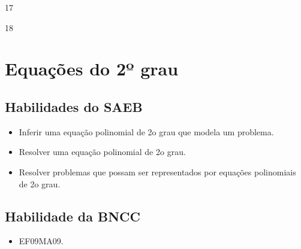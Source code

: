 \begin{escolha}
\begin{boxmedio}
\begin{boxmedio}
{\begin{boxpeq}
\begin{boxpeq}
{\begin{boxpeq}
\begin{boxmedio}
\begin{boxmedio}
\begin{boxpeq}
\begin{boxmedio}
\begin{boxpeq}
\begin{boxpeq}
\begin{boxpeq}
\begin{boxpeq}
\begin{boxmedio}
{\begin{boxmedio}
\begin{boxmedio}
\begin{boxpeq}
\begin{boxmedio}
\begin{boxpeq}
\begin{boxpeq}
\begin{boxpeq}
\begin{escolha}
{\begin{boxmedio}
\begin{boxpeq}
\begin{boxpeq}
\begin{boxpeq}
\begin{boxpeq}
\begin{escolha}
  \item 17

  \item 18
\end{escolha}


\chapter{Equações do 2º grau}

\section{Habilidades do SAEB}

\begin{itemize}

  \item Inferir uma equação polinomial de 2o grau que modela um problema.
  \item Resolver uma equação polinomial de 2o grau.
  \item Resolver problemas que possam ser representados por equações
polinomiais de 2o grau.   

\end{itemize} 

\section{Habilidade da BNCC}

\begin{itemize}
  \item EF09MA09.
\end{itemize}

\conteudo{

}
\end{boxpeq}
\end{boxpeq}
\end{boxpeq}
\end{boxpeq}
\end{boxmedio}}
\end{escolha}
\end{boxpeq}
\end{boxpeq}
\end{boxpeq}
\end{boxmedio}
\end{boxpeq}
\end{boxmedio}
\end{boxmedio}}
\end{boxmedio}
\end{boxpeq}
\end{boxpeq}
\end{boxpeq}
\end{boxpeq}
\end{boxmedio}
\end{boxpeq}
\end{boxmedio}
\end{boxmedio}
\end{boxpeq}}
\end{boxpeq}
\end{boxpeq}}
\end{boxmedio}
\end{boxmedio}
\end{escolha}
